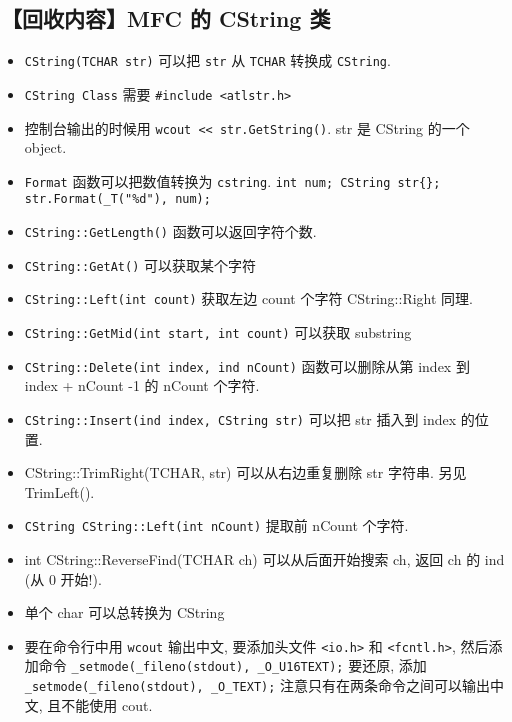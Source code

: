 \subsection{【回收内容】MFC 的 CString 类}
\begin{itemize}
\item \verb`CString(TCHAR str)` 可以把 \verb`str` 从 \verb`TCHAR` 转换成 \verb`CString`.
\item \verb`CString Class` 需要 \verb`#include <atlstr.h>`
\item 控制台输出的时候用 \verb`wcout << str.GetString()`.  str 是 CString 的一个 object.
\item \verb`Format` 函数可以把数值转换为 \verb`cstring`. \verb`int num; CString str{}; str.Format(_T("%d"), num);`
\item \verb`CString::GetLength()` 函数可以返回字符个数.
\item \verb`CString::GetAt()` 可以获取某个字符
\item \verb`CString::Left(int count)` 获取左边 count 个字符 CString::Right 同理.
\item \verb`CString::GetMid(int start, int count)` 可以获取 substring
\item \verb`CString::Delete(int index, ind nCount)` 函数可以删除从第 index 到 index + nCount -1 的 nCount 个字符.
\item \verb`CString::Insert(ind index, CString str)` 可以把 str 插入到 index 的位置.
\item CString::TrimRight(TCHAR, str) 可以从右边重复删除 str 字符串. 另见 TrimLeft().
\item \verb`CString CString::Left(int nCount)` 提取前 nCount 个字符.
\item int CString::ReverseFind(TCHAR ch) 可以从后面开始搜索 ch, 返回 ch 的 ind (从 0 开始!).
\item 单个 char 可以总转换为 CString

\item 要在命令行中用 \verb`wcout` 输出中文, 要添加头文件 \verb`<io.h>` 和 \verb`<fcntl.h>`, 然后添加命令 \verb|_setmode(_fileno(stdout), _O_U16TEXT);| 要还原, 添加 \verb|_setmode(_fileno(stdout), _O_TEXT);| 注意只有在两条命令之间可以输出中文, 且不能使用 cout.
\end{itemize}
